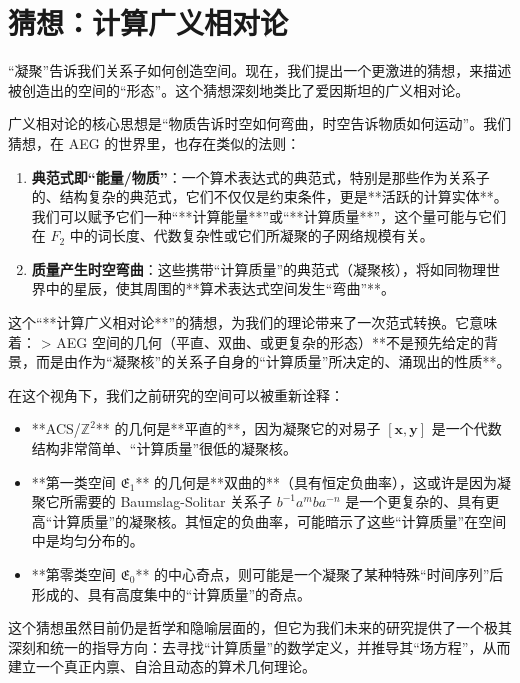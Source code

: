 \documentclass[a4paper,12pt]{book}
\numberwithin{problem}{section}
\numberwithin{definition}{section}
\numberwithin{lemma}{section}
\numberwithin{proposition}{section}
\numberwithin{theorem}{section}
\numberwithin{grammar}{section}
\numberwithin{program}{section}
\numberwithin{convention}{section}
\numberwithin{corollary}{section}
\begin{document}
\section{猜想：计算广义相对论}
\label{sec:computational_gr}

“凝聚”告诉我们关系子如何创造空间。现在，我们提出一个更激进的猜想，来描述被创造出的空间的“形态”。这个猜想深刻地类比了爱因斯坦的广义相对论。

广义相对论的核心思想是“物质告诉时空如何弯曲，时空告诉物质如何运动”。我们猜想，在 AEG 的世界里，也存在类似的法则：
\begin{enumerate}
    \item \textbf{典范式即“能量/物质”}：一个算术表达式的典范式，特别是那些作为关系子的、结构复杂的典范式，它们不仅仅是约束条件，更是**活跃的计算实体**。我们可以赋予它们一种“**计算能量**”或“**计算质量**”，这个量可能与它们在 $F_2$ 中的词长度、代数复杂性或它们所凝聚的子网络规模有关。
    \item \textbf{质量产生时空弯曲}：这些携带“计算质量”的典范式（凝聚核），将如同物理世界中的星辰，使其周围的**算术表达式空间发生“弯曲”**。
\end{enumerate}

这个“**计算广义相对论**”的猜想，为我们的理论带来了一次范式转换。它意味着：
> AEG 空间的几何（平直、双曲、或更复杂的形态）**不是预先给定的背景，而是由作为“凝聚核”的关系子自身的“计算质量”所决定的、涌现出的性质**。

在这个视角下，我们之前研究的空间可以被重新诠释：
\begin{itemize}
    \item **ACS/$\mathbb{Z}^2$** 的几何是**平直的**，因为凝聚它的对易子 $[\mathbf{x}, \mathbf{y}]$ 是一个代数结构非常简单、“计算质量”很低的凝聚核。
    \item **第一类空间 $\mathfrak{E}_1$** 的几何是**双曲的**（具有恒定负曲率），这或许是因为凝聚它所需要的 Baumslag-Solitar 关系子 $b^{-1}a^m b a^{-n}$ 是一个更复杂的、具有更高“计算质量”的凝聚核。其恒定的负曲率，可能暗示了这些“计算质量”在空间中是均匀分布的。
    \item **第零类空间 $\mathfrak{E}_0$** 的中心奇点，则可能是一个凝聚了某种特殊“时间序列”后形成的、具有高度集中的“计算质量”的奇点。
\end{itemize}

这个猜想虽然目前仍是哲学和隐喻层面的，但它为我们未来的研究提供了一个极其深刻和统一的指导方向：去寻找“计算质量”的数学定义，并推导其“场方程”，从而建立一个真正内禀、自洽且动态的算术几何理论。

\end{document}
